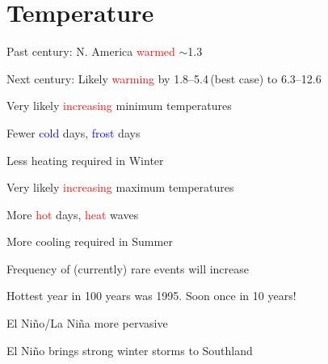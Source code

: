 \documentclass[12pt]{article}
\begin{document}
\section[Temperature]{Temperature}
\begin{itemize*}
\item Past century: N. America \textcolor{red}{warmed} $\sim$1.3\,\dgrf
\item Next century: Likely \textcolor{red}{warming} by 1.8--5.4\,\dgrf (best case) to 6.3--12.6\,\dgrf
\begin{itemize*}
\item Very likely \textcolor{red}{increasing} minimum temperatures
\begin{itemize*}
\item Fewer \textcolor{blue}{cold} days, \textcolor{blue}{frost} days
\item Less heating required in Winter
\end{itemize*}
\item Very likely \textcolor{red}{increasing} maximum temperatures
\begin{itemize*}
\item More \textcolor{red}{hot} days, \textcolor{red}{heat} waves
\item More cooling required in Summer
\end{itemize*}
\item Frequency of (currently) rare events will increase
\begin{itemize*}
\item Hottest year in 100 years was 1995. Soon once in 10 years!
\end{itemize*}
\end{itemize*}
\item El Ni\~{n}o/La Ni\~{n}a more pervasive
\begin{itemize*}
\item El Ni\~{n}o brings strong winter storms to Southland
\end{itemize*}
\end{itemize*}
\vfill
\end{document}
